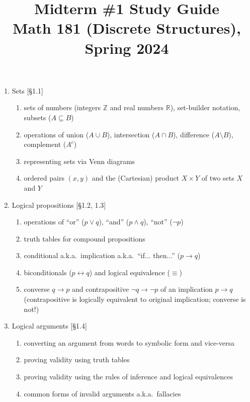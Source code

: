 \documentclass[11pt]{article}
\title{Midterm \#1 Study Guide \\Math 181 (Discrete Structures), Spring 2024}
\date{}
\begin{document}
\maketitle

\thispagestyle{empty}

\vspace{-1cm}

\begin{enumerate}
\item Sets [\S1.1] 
\begin{enumerate}
\item sets of numbers (integers $\mathbb{Z}$ and real numbers $\mathbb{R}$), set-builder notation, subsets ($A \subseteq B$)
\item operations of union ($A \cup B$), intersection ($A \cap B$), difference ($A \setminus B$), complement ($A^c$)
\item representing sets via Venn diagrams
\item ordered pairs $(x,y)$ and the (Cartesian) product $X \times Y$ of two sets $X$ and $Y$
\end{enumerate}

\item Logical propositions [\S1.2, 1.3]
\begin{enumerate}
\item operations of ``or'' ($p \vee q$), ``and'' ($p \wedge q$), ``not'' ($\neg p$)
\item truth tables for compound propositions 
\item conditional a.k.a.~implication a.k.a.~``if... then...'' ($p \to q$)
\item biconditionals ($p \leftrightarrow q$) and logical equivalence ($\equiv$)
\item converse $q \to p$ and contrapositive $\neg q \to \neg p$ of an implication $p\to q$ \\
(contrapositive is logically equivalent to original implication; converse is not!)
\end{enumerate}

\item Logical arguments [\S1.4]
\begin{enumerate}
\item converting an argument from words to symbolic form and vice-versa
\item proving validity using truth tables
\item proving validity using the rules of inference and logical equivalences
\item common forms of invalid arguments a.k.a.~fallacies
\end{enumerate}


\end{enumerate}
\end{document}
